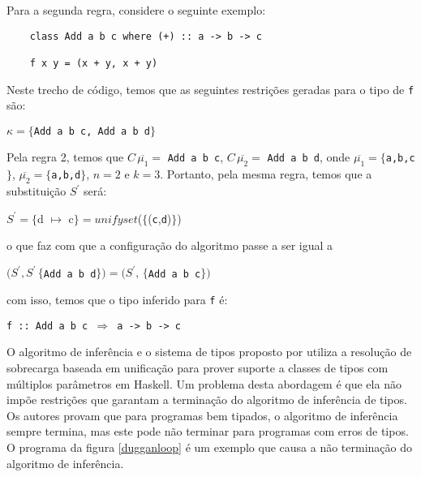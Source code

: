 Para a segunda regra, considere o seguinte exemplo:

\begin{verbatim}
    class Add a b c where (+) :: a -> b -> c
	
    f x y = (x + y, x + y) 
\end{verbatim}

Neste trecho de c\'odigo, temos que as seguintes restri\c{c}\~oes geradas para o tipo de \texttt{f} s\~ao:
\begin{center}
   $\kappa=\{$\texttt{Add a b c, Add a b d}$\}$
\end{center}
Pela regra 2, temos que $C\,\overline{\mu_{1}}=$ \texttt{Add a b c}, $C\,\overline{\mu_{2}}=$ \texttt{Add a b d}, onde 
$\overline{\mu_{1}}=\{$\texttt{a,b,c}$\}$, $\overline{\mu_{2}}=\{$\texttt{a,b,d}$\}$, $n=2$ e $k=3$. Portanto, pela
mesma regra, temos que a substitui\c{c}\~ao $S^{\prime}$ ser\'a:
\begin{center} 
$S^{\prime}=\{$d $\mapsto$ c$\}=unifyset$($\{$(\texttt{c},\texttt{d})$\}$)
\end{center}
o que faz com que a configura\c{c}\~ao do algoritmo passe a ser igual a 
\begin{center}
$(S^{\prime},S^{\prime}\,\{$\texttt{Add a b d}$\}) = (S^{\prime},\,\{$\texttt{Add a b c}$\})$
\end{center}
com isso, temos que o tipo inferido para \texttt{f} \'e: 
\begin{center}
	\texttt{f :: Add a b c $\Rightarrow$ a -> b -> c}
\end{center}

O algoritmo de infer\^encia e o sistema de tipos proposto por \cite{Duggan02a} utiliza a resolu\c{c}\~ao de sobrecarga
baseada em unifica\c{c}\~ao para prover suporte a classes de tipos com m\'ultiplos par\^ametros em Haskell. Um problema
desta abordagem \'e que ela n\~ao imp\~oe restri\c{c}\~oes que garantam a termina\c{c}\~ao do algoritmo de infer\^encia 
de tipos. Os autores provam que para programas bem tipados, o algoritmo de infer\^encia sempre termina, mas este pode 
n\~ao terminar para programas com erros de tipos. O programa da figura \ref{dugganloop} \'e um exemplo que causa a 
n\~ao termina\c{c}\~ao do algoritmo de infer\^encia.

